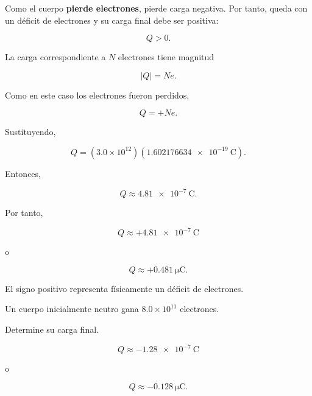 \begin{explicacion}

Como el cuerpo \textbf{pierde electrones}, pierde carga negativa.
Por tanto, queda con un déficit de electrones y su carga final debe ser
positiva:

\[
Q>0.
\]

La carga correspondiente a \(N\) electrones tiene magnitud

\[
|Q|=Ne.
\]

Como en este caso los electrones fueron perdidos,

\[
Q=+Ne.
\]

Sustituyendo,

\[
Q=
\left(3.0\times10^{12}\right)
\left(\SI{1.602176634e-19}{\coulomb}\right).
\]

Entonces,

\[
Q\approx\SI{4.81e-7}{\coulomb}.
\]

Por tanto,

\[
\boxed{
Q\approx+\SI{4.81e-7}{\coulomb}
}
\]

o

\[
\boxed{
Q\approx+\SI{0.481}{\micro\coulomb}
}.
\]

El signo positivo representa físicamente un déficit de electrones.

\end{explicacion}



\begin{ejercicio}

Un cuerpo inicialmente neutro gana \(8.0\times10^{11}\) electrones.

Determine su carga final.

\end{ejercicio}

\begin{respuesta}

\[
\boxed{
Q\approx-\SI{1.28e-7}{\coulomb}
}
\]

o

\[
\boxed{
Q\approx-\SI{0.128}{\micro\coulomb}
}.
\]

\end{respuesta}

